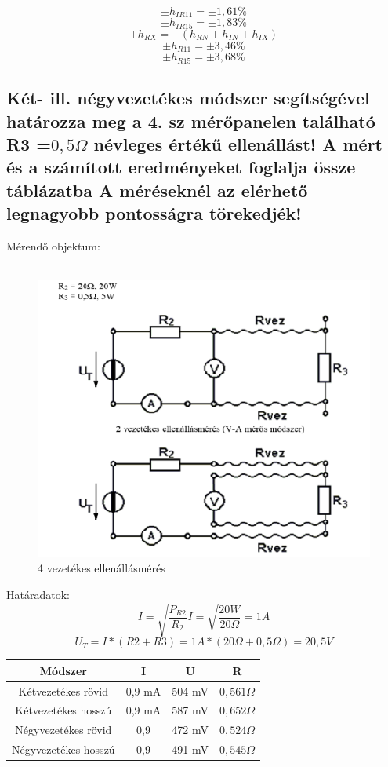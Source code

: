 \documentclass[10pt,a4paper]{article}
\begin{document}
		$$\pm h_{IR11} = \pm 1,61 \%$$
		$$\pm h_{IR15} = \pm 1,83 \%$$
		$$\pm h_{RX} = \pm \left(h_{RN} + h_{IN} + h_{IX}\right)$$
		$$\pm h_{R11} = \pm 3,46 \%$$
		$$\pm h_{R15} = \pm 3,68 \%$$
		\newpage
		\subsection{Két- ill. négyvezetékes módszer segítségével határozza meg a 4. sz
mérőpanelen található R3 =$ 0,5\Omega$ névleges értékű ellenállást! A mért és a
számított eredményeket foglalja össze táblázatba A méréseknél az elérhető
legnagyobb pontosságra törekedjék!}
		Mérendő objektum:\\\\
		\begin{figure}[hbtp]
		\centering
		\includegraphics[scale=0.5]{teljes/ket_negy_vez.png}
		\caption{4 vezetékes ellenállásmérés}
		\end{figure}
		
		Határadatok:
		$$I = \sqrt{\frac{P_{R2}}{R_2}} I = \sqrt{\frac{20W}{20\Omega}} = 1 A$$
		$$U_T = I * \left(R2 + R3\right) = 1A * \left(20\Omega + 0,5\Omega\right) = 20,5 V$$\begin{tabular}{|c|c|c|c|}
		\hline 
		Módszer & I & U & R \\ 
		\hline 
		Kétvezetékes rövid & 0,9 mA & 504 mV & $0,561 \Omega$ \\ 
		\hline 
		Kétvezetékes hosszú & 0,9 mA & 587 mV & $0,652 \Omega$ \\ 
		\hline 
		Négyvezetékes rövid & 0,9 & 472 mV & $0,524 \Omega$ \\ 
		\hline 
		Négyvezetékes hosszú & 0,9 & 491 mV & $0,545 \Omega$ \\ 
		\hline 
		\end{tabular} 
		\newpage
\end{document}
